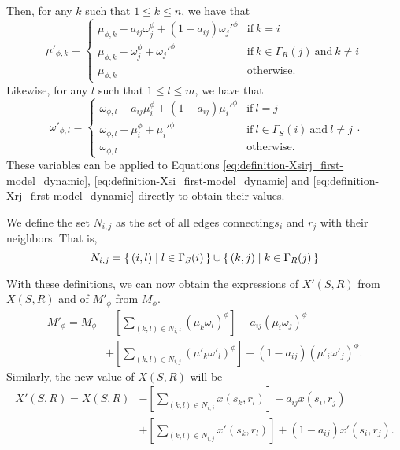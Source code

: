 Then, for any $k$ such that $1 \leq k \leq n$, we have that
\begin{equation}
  \label{eq:definition-muphik_dynamic}
  \mu'_{\phi,k} = \begin{cases}
    \mu_{\phi,k} - a_{ij} \omega_j^\phi + (1 - a_{ij}) {\omega_j'}^\phi & \text{if}~k=i \\
    \mu_{\phi,k} - \omega_j^\phi + {\omega_j'}^\phi & \text{if}~k \in \Gamma_R(j)~\text{and}~k \neq i \\
    \mu_{\phi,k} & \text{otherwise}.
  \end{cases}
\end{equation}
Likewise, for any $l$ such that $1 \leq l \leq m$, we have that
\begin{equation}
  \label{eq:definition-wphik_dynamic}
  \omega'_{\phi,l} = \begin{cases}
    \omega_{\phi,l} - a_{ij} \mu_i^\phi + (1 - a_{ij}) {\mu_i'}^\phi & \text{if}~l=j \\
    \omega_{\phi,l} - \mu_i^\phi + {\mu_i'}^\phi & \text{if}~l \in \Gamma_S(i)~\text{and}~l \neq j \\
    \omega_{\phi,l} & \text{otherwise}.
  \end{cases}.
\end{equation}
These variables can be applied to Equations \eqref{eq:definition-Xsirj_first-model_dynamic}, \eqref{eq:definition-Xsi_first-model_dynamic} and \eqref{eq:definition-Xrj_first-model_dynamic} directly to obtain their values.

We define the set $N_{i,j}$  as the set of all edges connecting$s_i$ and $r_j$ with their neighbors.
That is,
\begin{equation}
  \label{eq:definition-Nij}
  N_{i,j} = \{\,(i,l)\mid l \in \Gamma_S(i)\,\} \cup \{\,(k,j)\mid k \in \Gamma_R(j)\,\}
\end{equation}

With these definitions, we can now obtain the expressions of $X'(S,R)$ from $X(S,R)$ and of $M'_\phi$ from $M_\phi$.
\begin{equation*}
\begin{split}
  M'_{\phi} = M_\phi &- \left[ \sum_{(k,l) \in N_{i,j}}(\mu_k \omega_l)^\phi \right]   - a_{ij} (\mu_i \omega_j)^\phi \\
                     &+ \left[ \sum_{(k,l) \in N_{i,j}}(\mu'_k \omega'_l)^\phi \right] + (1 - a_{ij}) (\mu'_i \omega'_j)^\phi.
\end{split}
\end{equation*}
Similarly, the new value of $X(S,R)$ will be
\begin{equation}
  \label{eq:definition-XSR_first-model_dynamic}
\begin{split}
  X'(S,R) = X(S,R) &- \left[ \sum_{(k,l) \in N_{i,j}}x(s_k, r_l) \right] - a_{ij} x(s_i, r_j) \\
                   &+ \left[ \sum_{(k,l) \in N_{i,j}}x'(s_k, r_l)\right] + (1 - a_{ij}) x'(s_i, r_j).
\end{split}
\end{equation}

